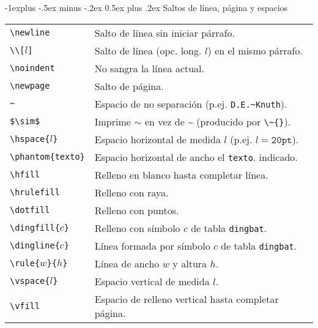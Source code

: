 \documentclass[10pt,landscape,a4paper]{article}
\makeatletter
\renewcommand{\subsection}{\@startsection{subsection}{2}{0mm}%
                                {-1explus -.5ex minus -.2ex}%
                                {0.5ex plus .2ex}%
                                {\normalfont\normalsize\bfseries}}
\makeatother
\begin{document}
\begin{multicols}{3}
\subsection{Saltos de línea, página y espacios}
\begin{tabular}{@{}p{\the\MyLen}%
                @{}p{\linewidth-\the\MyLen}@{}}
\verb!\newline!			&  Salto de línea sin iniciar párrafo.  \\
\verb!\\[!$l$\verb!]!	&  Salto de línea (opc. long. $l$) en el mismo párrafo.   \\
\verb!\noindent!   		&  No sangra la línea actual. \\
\verb!\newpage!    		&  Salto de página. \\
\verb!~!       			&  Espacio de no separación (p.ej. \verb!D.E.~Knuth!). \\
\verb!$\sim$!  			&  Imprime $\sim$ en vez de \~{} (producido por \verb!\~{}!). \\
\verb!\hspace{!$l$\verb!}! 		& Espacio horizontal de medida $l$
                                (p.ej. $l=\mathtt{20pt}$). \\
\verb!\phantom{texto}! 	& Espacio horizontal de ancho el \texttt{texto}. indicado. \\
\verb!\hfill!  			& Relleno en blanco hasta completar línea.\\
\verb!\hrulefill!  		& Relleno con raya. \\
\verb!\dotfill!    		& Relleno con puntos. \\
\verb!\dingfill{!$c$\verb!}!    & Relleno con símbolo $c$ de tabla \texttt{dingbat}. \\
\verb!\dingline{!$c$\verb!}!    & Línea formada por símbolo $c$ de tabla \texttt{dingbat}. \\
\verb!\rule{!$w$\verb!}{!$h$\verb!}! & Línea de ancho $w$ y altura $h$. \\
\verb!\vspace{!$l$\verb!}! 		& Espacio vertical de medida $l$. \\
\verb!\vfill!  			& Espacio de relleno vertical hasta completar página. \\
\end{tabular}






\end{multicols}
\end{document}
